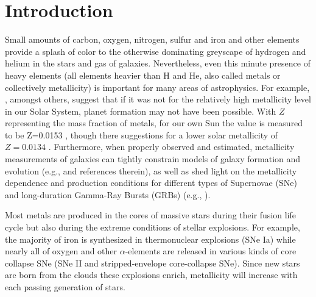 \documentclass{emulateapj}
\begin{document}
\section{Introduction}
Small amounts of carbon, oxygen, nitrogen, sulfur and iron and other elements provide a splash of color to the otherwise dominating greyscape of hydrogen and helium in the stars and gas of galaxies. Nevertheless, even this minute presence of heavy elements (all elements heavier than H and He, also called metals or collectively metallicity) is important for many areas of astrophysics. For example, \citet{johnson12}, amongst others, suggest that if it was not for the relatively high metallicity level in our Solar System, planet formation may not have been possible. With $Z$ representing the mass fraction of metals, for our own Sun the value is measured to be  Z=0.0153 \citep{chaffau11}, though there suggestions for a lower solar metallicity of $Z=0.0134$  \citep{asplund09_rev,grevesse10}. 
Furthermore, when properly observed and estimated, metallicity measurements of galaxies can tightly constrain models of galaxy formation and evolution (e.g., \citealt{kewley08} and references therein), as well as shed light on the metallicity dependence and production conditions for different types of Supernovae (SNe) and long-duration Gamma-Ray Bursts (GRBs) (e.g., \citealt{modjaz08_Z,levesque10_grbhosts,anderson10,modjaz11,kelly12,sanders12,lunnan14,leloudas14,pan14}).

Most metals are produced in the cores of massive stars during their fusion life cycle but also during the extreme conditions of stellar explosions. For example, the majority of iron is synthesized in thermonuclear explosions (SNe Ia) while nearly all of oxygen and other $\alpha$-elements are released in various kinds of core collapse SNe (SNe II and stripped-envelope core-collapse SNe). Since new stars are born from the clouds these explosions enrich, metallicity will increase with each passing generation of stars. 

\end{document}
